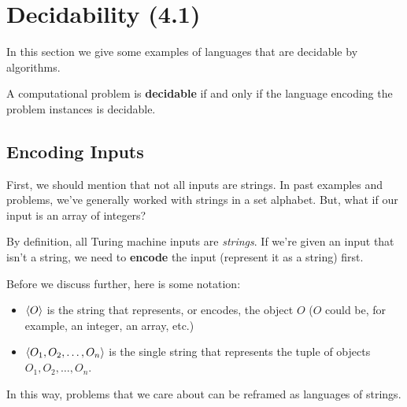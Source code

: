\documentclass[letterpaper]{article}
\begin{document}
\section{Decidability (4.1)} 
In this section we give some examples of languages that are decidable by algorithms. 

\bigskip 

A computational problem is \textbf{decidable} if and only if the language encoding the problem instances is decidable. 

\subsection{Encoding Inputs}
First, we should mention that not all inputs are strings. In past examples and problems, we've generally worked with strings in a set alphabet. But, what if our input is an array of integers? 

\bigskip 

By definition, all Turing machine inputs are \emph{strings}. If we're given an input that isn't a string, we need to \textbf{encode} the input (represent it as a string) first. 

\bigskip 

Before we discuss further, here is some notation: 
\begin{itemize}
    \item $\langle O \rangle$ is the string that represents, or encodes, the object $O$ ($O$ could be, for example, an integer, an array, etc.)
    \item $\langle O_1, O_2, \dots, O_n \rangle$ is the single string that represents the tuple of objects $O_1, O_2, \dots, O_n$. 
\end{itemize}

In this way, problems that we care about can be reframed as languages of strings. 
\end{document}
